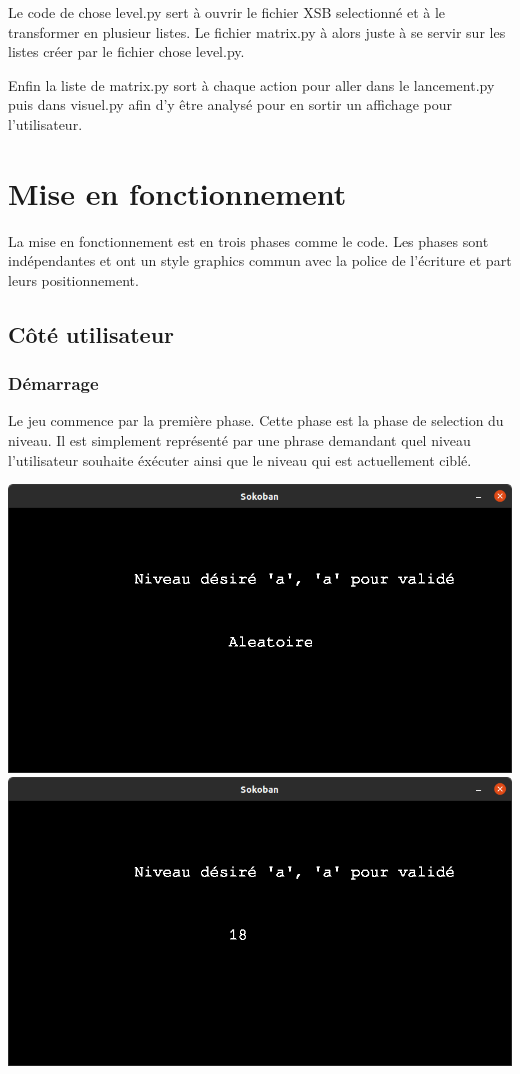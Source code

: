 \documentclass[a4paper,12pt]{article} %
\begin{document}
Le code de chose level.py sert à ouvrir le fichier XSB selectionné et à le transformer en plusieur listes.
Le fichier matrix.py à alors juste à se servir sur les listes créer par le fichier chose level.py.

Enfin la liste de matrix.py sort à chaque action pour aller dans le lancement.py puis dans visuel.py afin d'y être analysé pour en sortir un affichage pour l'utilisateur.

\newpage

\section{Mise en fonctionnement}

La mise en fonctionnement est en trois phases comme le code.
Les phases sont indépendantes et ont un style graphics commun avec la police de l'écriture et part leurs positionnement.

\subsection{Côté utilisateur}

\subsubsection{Démarrage}

Le jeu commence par la première phase.
Cette phase est la phase de selection du niveau.
Il est simplement représenté par une phrase demandant quel niveau l'utilisateur souhaite éxécuter ainsi que le niveau qui est actuellement ciblé.

\includegraphics[scale = 0.25]{../picture/starting.png}
\includegraphics[scale = 0.25]{../picture/starting2.png}
\end{document}
